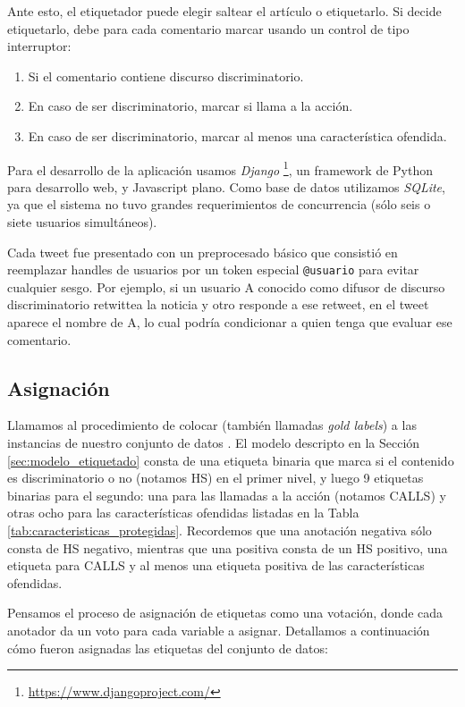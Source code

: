 Ante esto, el etiquetador puede elegir saltear el artículo o etiquetarlo. Si decide etiquetarlo, debe para cada comentario marcar usando un control de tipo interruptor:

\begin{enumerate}
    \item Si el comentario contiene discurso discriminatorio.
    \item En caso de ser discriminatorio, marcar si llama a la acción.
    \item En caso de ser discriminatorio, marcar al menos una característica ofendida.
\end{enumerate}

Para el desarrollo de la aplicación usamos \emph{Django} \footnote{\url{https://www.djangoproject.com/}}, un framework de Python para desarrollo web, y Javascript plano. Como base de datos utilizamos \emph{SQLite}, ya que el sistema no tuvo grandes requerimientos de concurrencia (sólo seis o siete usuarios simultáneos).


Cada tweet fue presentado con un preprocesado básico que consistió en reemplazar handles de usuarios por un token especial \verb|@usuario| para evitar cualquier sesgo. Por ejemplo, si un usuario A conocido como difusor de discurso discriminatorio retwittea la noticia y otro responde a ese retweet, en el tweet aparece el nombre de A, lo cual podría condicionar a quien tenga que evaluar ese comentario.


\subsection{Asignación}

Llamamos  al procedimiento de colocar  (también llamadas \emph{gold labels}) a las instancias de nuestro conjunto de datos \cite{pustejovsky2012natural}. El modelo descripto en la Sección \ref{sec:modelo_etiquetado} consta de una etiqueta binaria que marca si el contenido es discriminatorio o no (notamos HS) en el primer nivel, y luego 9 etiquetas binarias para el segundo: una para las llamadas a la acción (notamos CALLS) y otras ocho para las características ofendidas listadas en la Tabla \ref{tab:caracteristicas_protegidas}. Recordemos que una anotación negativa sólo consta de HS negativo, mientras que una positiva consta de un HS positivo, una etiqueta para CALLS y al menos una etiqueta positiva de las características ofendidas.

Pensamos el proceso de asignación de etiquetas como una votación, donde cada anotador da un voto para cada variable a asignar. Detallamos a continuación cómo fueron asignadas las etiquetas del conjunto de datos:

